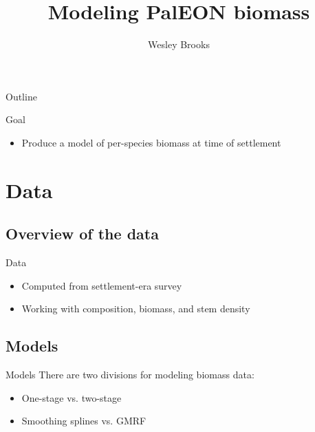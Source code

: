 \documentclass{beamer}
\author{Wesley Brooks}
\title{Modeling PalEON biomass}
\institute{UW-Madison}
\begin{document}
\begin{frame}
\titlepage
\end{frame}


\begin{frame}{Outline}
  \tableofcontents
\end{frame}


\begin{frame}{Goal}
  \begin{itemize}
    \item Produce a model of per-species biomass at time of settlement
  \end{itemize}
\end{frame}

\section{Data}
\subsection{Overview of the data}

\begin{frame}{Data}
  \begin{itemize}
    \item Computed from settlement-era survey
    \item Working with composition, biomass, and stem density
  \end{itemize}
\end{frame}


%
\begin{frame}{}
\begin{center}
\end{center}
\end{frame}


\subsection{Models}


\begin{frame}{Models}
  There are two divisions for modeling biomass data:
  \begin{itemize}
    \item One-stage vs. two-stage
    \item Smoothing splines vs. GMRF
   \end{itemize}
\end{frame}
\end{document}
